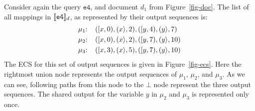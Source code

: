 \begin{example}
Consider again the query $\texttt{e4}$, and document $d_1$ from Figure~\ref{fig-doc}. The list of all mappings in $\llbracket\texttt{e4}\rrbracket_d$, as represented by their output sequences is:
\begin{align*}
	\mu_1 & \text{: } \ \ (\Open{x},0),(\Close{x},2),(\Open{y},4),(\Close{y},7)  \\%
	\mu_2 & \text{: } \ \ (\Open{x},0),(\Close{x},2),(\Open{y},7),(\Close{y},10) \\ %
	\mu_3 & \text{: } \ \ (\Open{x},3),(\Close{x},5),(\Open{y},7),(\Close{y},10)
\end{align*}
The ECS for this set of output sequences is given in Figure~\ref{fig-ecs}. Here the rightmost union node represents the output sequences of $\mu_1$, $\mu_2$, and $\mu_3$. As we can see, following paths from this node to the $\bot$ node represent the three output sequences. The shared output for the variable $y$ in $\mu_2$ and $\mu_3$ is represented only once.
\end{example}



